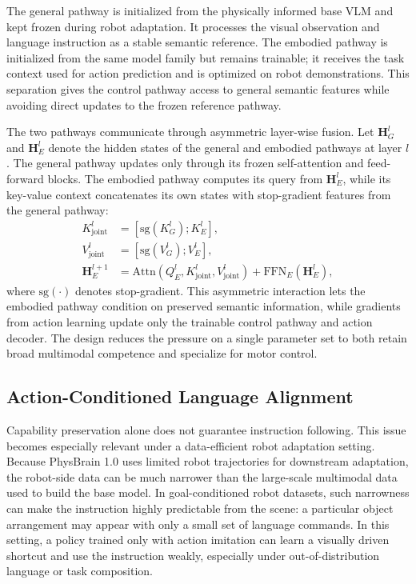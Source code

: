 \documentclass{llmxive}
\begin{document}
The general pathway is initialized from the physically informed base VLM and kept frozen during robot adaptation. It processes the visual observation and language instruction as a stable semantic reference. The embodied pathway is initialized from the same model family but remains trainable; it receives the task context used for action prediction and is optimized on robot demonstrations. This separation gives the control pathway access to general semantic features while avoiding direct updates to the frozen reference pathway.

The two pathways communicate through asymmetric layer-wise fusion. Let $\mathbf{H}_G^l$ and $\mathbf{H}_E^l$ denote the hidden states of the general and embodied pathways at layer $l$. The general pathway updates only through its frozen self-attention and feed-forward blocks. The embodied pathway computes its query from $\mathbf{H}_E^l$, while its key-value context concatenates its own states with stop-gradient features from the general pathway:
\begin{align}
    K_{\mathrm{joint}}^l &= [\mathrm{sg}(K_G^l); K_E^l], \\
    V_{\mathrm{joint}}^l &= [\mathrm{sg}(V_G^l); V_E^l], \\
    \mathbf{H}_E^{l+1} &= \mathrm{Attn}(Q_E^l, K_{\mathrm{joint}}^l, V_{\mathrm{joint}}^l) + \mathrm{FFN}_E(\mathbf{H}_E^l),
\end{align}
where $\mathrm{sg}(\cdot)$ denotes stop-gradient. This asymmetric interaction lets the embodied pathway condition on preserved semantic information, while gradients from action learning update only the trainable control pathway and action decoder. The design reduces the pressure on a single parameter set to both retain broad multimodal competence and specialize for motor control.

\subsection{Action-Conditioned Language Alignment}

Capability preservation alone does not guarantee instruction following. This issue becomes especially relevant under a data-efficient robot adaptation setting. Because PhysBrain 1.0 uses limited robot trajectories for downstream adaptation, the robot-side data can be much narrower than the large-scale multimodal data used to build the base model. In goal-conditioned robot datasets, such narrowness can make the instruction highly predictable from the scene: a particular object arrangement may appear with only a small set of language commands. In this setting, a policy trained only with action imitation can learn a visually driven shortcut and use the instruction weakly, especially under out-of-distribution language or task composition.
\end{document}
